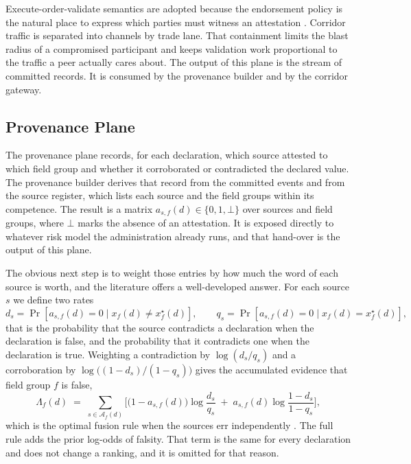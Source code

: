 \documentclass[information,article,submit,moreauthors]{Definitions/mdpi}
\begin{document}
Execute-order-validate semantics are adopted because the endorsement policy is the natural place to express which parties must witness an attestation \cite{androulaki2018fabric}. Corridor traffic is separated into channels by trade lane. That containment limits the blast radius of a compromised participant and keeps validation work proportional to the traffic a peer actually cares about. The output of this plane is the stream of committed records. It is consumed by the provenance builder and by the corridor gateway.

\subsection{Provenance Plane}

The provenance plane records, for each declaration, which source attested to which field group and whether it corroborated or contradicted the declared value. The provenance builder derives that record from the committed events and from the source register, which lists each source and the field groups within its competence. The result is a matrix $a_{s,f}(d) \in \{0, 1, \bot\}$ over sources and field groups, where $\bot$ marks the absence of an attestation. It is exposed directly to whatever risk model the administration already runs, and that hand-over is the output of this plane.

The obvious next step is to weight those entries by how much the word of each source is worth, and the literature offers a well-developed answer. For each source $s$ we define two rates
\begin{equation}
d_s = \Pr\!\left[a_{s,f}(d) = 0 \mid x_f(d) \neq x_f^{\star}(d)\right], \qquad
q_s = \Pr\!\left[a_{s,f}(d) = 0 \mid x_f(d) = x_f^{\star}(d)\right],
\end{equation}
that is the probability that the source contradicts a declaration when the declaration is false, and the probability that it contradicts one when the declaration is true. Weighting a contradiction by $\log(d_s/q_s)$ and a corroboration by $\log\!\big((1-d_s)/(1-q_s)\big)$ gives the accumulated evidence that field group $f$ is false,
\begin{equation}\label{eq:llr}
\Lambda_f(d) \;=\; \sum_{s \in \mathcal{A}_f(d)}
\Big[ \big(1-a_{s,f}(d)\big)\log\frac{d_s}{q_s}
\;+\; a_{s,f}(d)\log\frac{1-d_s}{1-q_s} \Big],
\end{equation}
which is the optimal fusion rule when the sources err independently \cite{chair1986fusion}. The full rule adds the prior log-odds of falsity. That term is the same for every declaration and does not change a ranking, and it is omitted for that reason.
\end{document}
